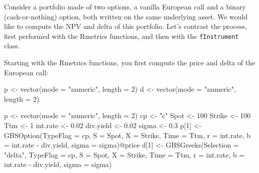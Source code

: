 \documentclass[justified]{tufte-book}
\newenvironment{Shaded}{}{}
\newcommand{\AttributeTok}[1]{\textcolor[rgb]{0.49,0.56,0.16}{#1}}
\newcommand{\DecValTok}[1]{\textcolor[rgb]{0.25,0.63,0.44}{#1}}
\newcommand{\FloatTok}[1]{\textcolor[rgb]{0.25,0.63,0.44}{#1}}
\newcommand{\FunctionTok}[1]{\textcolor[rgb]{0.02,0.16,0.49}{#1}}
\newcommand{\NormalTok}[1]{#1}
\newcommand{\OtherTok}[1]{\textcolor[rgb]{0.00,0.44,0.13}{#1}}
\newcommand{\SpecialCharTok}[1]{\textcolor[rgb]{0.25,0.44,0.63}{#1}}
\newcommand{\StringTok}[1]{\textcolor[rgb]{0.25,0.44,0.63}{#1}}
\newcommand{\class}[1]{\texttt{#1}}
\begin{document}
Consider a portfolio made of two options, a vanilla European call and a binary (cash-or-nothing) option, both written on the same underlying asset. We would like to compute the NPV and delta of this portfolio. Let's contrast the process, first performed with the Rmetrics functions, and then with the \class{fInstrument} class.

Starting with the Rmetrics functions, you first compute the price and delta of the European call:

\begin{Shaded}
\begin{Highlighting}[]
\NormalTok{p }\OtherTok{\textless{}{-}} \FunctionTok{vector}\NormalTok{(}\AttributeTok{mode =} \StringTok{"numeric"}\NormalTok{, }\AttributeTok{length =} \DecValTok{2}\NormalTok{)}
\NormalTok{d }\OtherTok{\textless{}{-}} \FunctionTok{vector}\NormalTok{(}\AttributeTok{mode =} \StringTok{"numeric"}\NormalTok{, }\AttributeTok{length =} \DecValTok{2}\NormalTok{)}
\end{Highlighting}
\end{Shaded}

\begin{Shaded}
\begin{Highlighting}[]
\NormalTok{p }\OtherTok{\textless{}{-}} \FunctionTok{vector}\NormalTok{(}\AttributeTok{mode =} \StringTok{"numeric"}\NormalTok{, }\AttributeTok{length =} \DecValTok{2}\NormalTok{)}
\NormalTok{cp }\OtherTok{\textless{}{-}} \StringTok{"c"}
\NormalTok{Spot }\OtherTok{\textless{}{-}} \DecValTok{100}
\NormalTok{Strike }\OtherTok{\textless{}{-}} \DecValTok{100}
\NormalTok{Ttm }\OtherTok{\textless{}{-}} \DecValTok{1}
\NormalTok{int.rate }\OtherTok{\textless{}{-}} \FloatTok{0.02}
\NormalTok{div.yield }\OtherTok{\textless{}{-}} \FloatTok{0.02}
\NormalTok{sigma }\OtherTok{\textless{}{-}} \FloatTok{0.3}
\NormalTok{p[}\DecValTok{1}\NormalTok{] }\OtherTok{\textless{}{-}} \FunctionTok{GBSOption}\NormalTok{(}\AttributeTok{TypeFlag =}\NormalTok{ cp, }\AttributeTok{S =}\NormalTok{ Spot, }\AttributeTok{X =}\NormalTok{ Strike,}
    \AttributeTok{Time =}\NormalTok{ Ttm, }\AttributeTok{r =}\NormalTok{ int.rate, }\AttributeTok{b =}\NormalTok{ int.rate }\SpecialCharTok{{-}}\NormalTok{ div.yield,}
    \AttributeTok{sigma =}\NormalTok{ sigma)}\SpecialCharTok{@}\NormalTok{price}
\NormalTok{d[}\DecValTok{1}\NormalTok{] }\OtherTok{\textless{}{-}} \FunctionTok{GBSGreeks}\NormalTok{(}\AttributeTok{Selection =} \StringTok{"delta"}\NormalTok{, }\AttributeTok{TypeFlag =}\NormalTok{ cp,}
    \AttributeTok{S =}\NormalTok{ Spot, }\AttributeTok{X =}\NormalTok{ Strike, }\AttributeTok{Time =}\NormalTok{ Ttm, }\AttributeTok{r =}\NormalTok{ int.rate,}
    \AttributeTok{b =}\NormalTok{ int.rate }\SpecialCharTok{{-}}\NormalTok{ div.yield, }\AttributeTok{sigma =}\NormalTok{ sigma)}
\end{Highlighting}
\end{Shaded}
\end{document}
